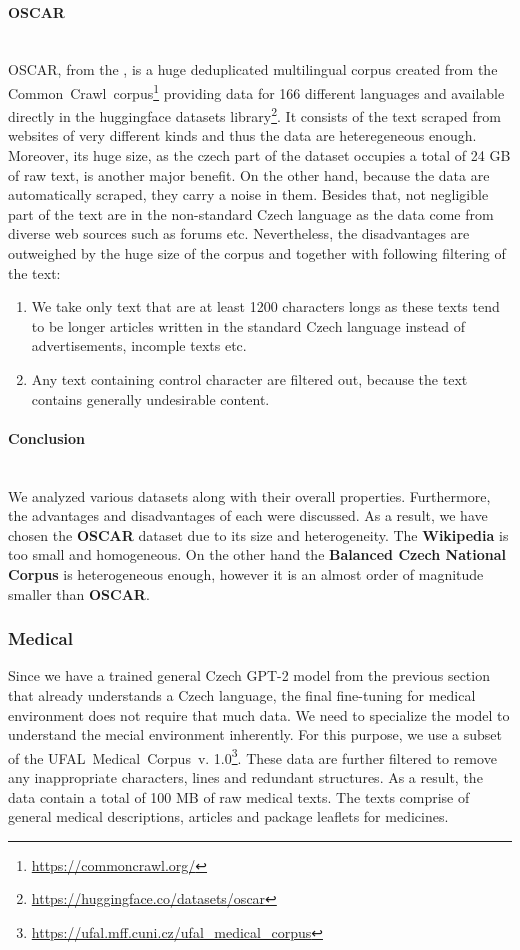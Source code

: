 \paragraph*{OSCAR} ~\\
\indent OSCAR, from the \citet{ortiz-suarez-etal-2020-monolingual}, is a huge deduplicated multilingual corpus created from the Common~Crawl~corpus\footnote[3]{\url{https://commoncrawl.org/}} providing data for 166 different languages and available directly in the huggingface datasets library\footnote[4]{\url{https://huggingface.co/datasets/oscar}}. It consists of the text scraped from websites of very different kinds and thus the data are heteregeneous enough. Moreover, its huge size, as the czech part of the dataset occupies a total of 24 GB of raw text, is another major benefit. On the other hand, because the data are automatically scraped, they carry a noise in them. Besides that, not negligible part of the text are in the non-standard Czech language as the data come from diverse web sources such as forums etc. Nevertheless, the disadvantages are outweighed by the huge size of the corpus and together with following filtering of the text:
\begin{enumerate}
	\item We take only text that are at least 1200 characters longs as these texts tend to be longer articles written in the standard Czech language instead of advertisements, incomple texts etc.
	\item Any text containing control character are filtered out, because the text contains generally undesirable content.
\end{enumerate}

\paragraph*{Conclusion} ~\\
\indent We analyzed various datasets along with their overall properties. Furthermore, the advantages and disadvantages of each were discussed. As a result, we have chosen the \textbf{OSCAR} dataset due to its size and heterogeneity. The \textbf{Wikipedia} is too small and homogeneous. On the other hand the \textbf{Balanced Czech National Corpus} is heterogeneous enough, however it is an almost order of magnitude smaller than \textbf{OSCAR}.

\subsubsection{Medical}
Since we have a trained general Czech GPT-2 model from the previous section that already understands a Czech language, the final fine-tuning for medical environment does not require that much data. We need to specialize the model to understand the mecial environment inherently. For this purpose, we use a subset of the UFAL~Medical~Corpus~v. 1.0\footnote[5]{\url{https://ufal.mff.cuni.cz/ufal\_medical\_corpus}}. These data are further filtered to remove any inappropriate characters, lines and redundant structures. As a result, the data contain a total of 100 MB of raw medical texts. The texts comprise of general medical descriptions, articles and package leaflets for medicines.

